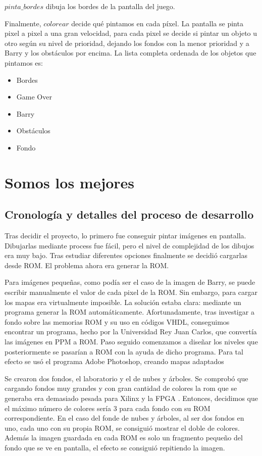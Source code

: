 \documentclass[11pt, a4paper, spanish, openright, twoside]{book}
\begin{document}
$pinta\_bordes$ dibuja los bordes de la pantalla del juego.

Finalmente, $colorear$ decide qué pintamos en cada píxel. La pantalla se pinta pixel a pixel a una gran velocidad, para cada pixel se decide si pintar un objeto u otro según su nivel de prioridad, dejando los fondos con la menor prioridad y a Barry y los obstáculos por encima. La lista completa ordenada de los objetos que pintamos es:
\begin{itemize}
	\item Bordes
	\item Game Over
	\item Barry
	\item Obstáculos
	\item Fondo
\end{itemize}

\section{Somos los mejores }
\subsection{Cronología y detalles del proceso de desarrollo}
Tras decidir el proyecto, lo primero fue conseguir pintar imágenes en pantalla. Dibujarlas mediante process fue fácil, pero el nivel de complejidad de los dibujos era muy bajo. Tras estudiar diferentes opciones finalmente se decidió cargarlas desde ROM.
El problema ahora era generar la ROM.

Para imágenes pequeñas, como podía ser el caso de la imagen de Barry, se puede escribir manualmente el valor de cada pixel de la ROM. Sin embargo, para cargar los mapas era virtualmente imposible. La solución estaba clara: mediante un programa generar la ROM automáticamente. Afortunadamente, tras investigar a fondo sobre las memorias ROM y su uso en códigos VHDL, conseguimos encontrar un programa, hecho por la Universidad Rey Juan Carlos, que convertía las imágenes en PPM a ROM. Paso seguido comenzamos a diseñar los niveles que posteriormente se pasarían a ROM con la ayuda de dicho programa. Para tal efecto se usó el programa Adobe Photoshop, creando mapas adaptados 

Se crearon dos fondos, el laboratorio y el de nubes y árboles. Se comprobó que cargando fondos muy grandes y con gran cantidad de colores la rom que se generaba era demasiado pesada para Xilinx y la FPGA . Entonces, decidimos que el máximo número de colores sería 3 para cada fondo con su ROM correspondiente. En el caso del fonde de nubes y árboles, al ser dos fondos en uno, cada uno con su propia ROM, se consiguió mostrar el doble de colores. Además la imagen guardada en cada ROM es solo un fragmento pequeño del fondo que se ve en pantalla, el efecto se consiguió repitiendo la imagen.
\end{document}
